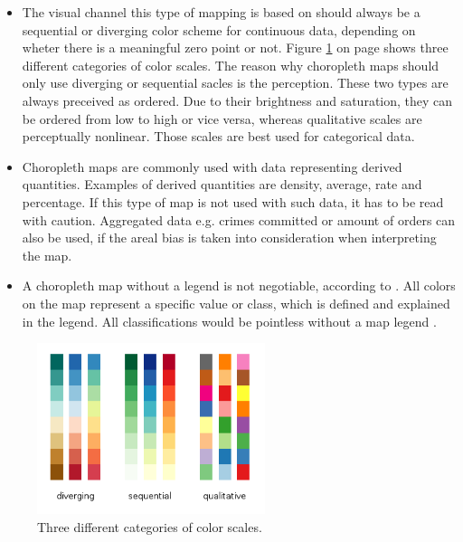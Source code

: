 \begin{itemize}

\item The visual channel this type of mapping is based on should always be a sequential or diverging color scheme for continuous data, depending on wheter there is a meaningful zero point or not. Figure \ref{fig:colorbrewer} on page \pageref{fig:colorbrewer} shows three different categories of color scales. The reason why choropleth maps should only use diverging or sequential sacles is the perception. These two types are always preceived as ordered. Due to their brightness and saturation, they can be ordered from low to high or vice versa, whereas qualitative scales are perceptually nonlinear. Those scales are best used for categorical data.

\item Choropleth maps are commonly used with data representing derived quantities. Examples of derived quantities are density, average, rate and percentage. If this type of map is not used with such data, it has to be read with caution. Aggregated data e.g. crimes committed or amount of orders can also be used, if the areal bias is taken into consideration when interpreting the map.

\item A choropleth map without a legend is not negotiable, according to \citeauthor{Dent2008}. All colors on the map represent a specific value or class, which is defined and explained in the legend. All classifications would be pointless without a map legend .

\end{itemize}

\begin{figure}[!htb]
\centering
\includegraphics[height=5cm,keepaspectratio]{images/choropleth/color-scales.png}
\caption[
    Three different categories of color scales, Urldate: 07.2016 \newline
    \small\texttt{\url{http://www.gnuplotting.org/figs/colorbrewer.png}}
]{Three different categories of color scales.}
\label{fig:colorbrewer}
\end{figure}

